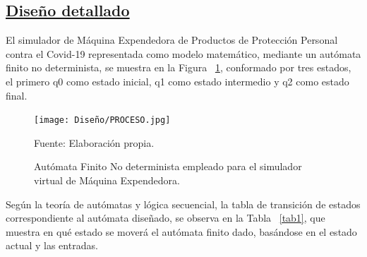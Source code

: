 \documentclass[10pt,conference]{IEEEtran}
\begin{document}
\subsection{\underline{\textbf{Diseño detallado}}}

El simulador de Máquina Expendedora de Productos de Protección Personal contra el Covid-19 representada como modelo matemático, mediante un autómata finito no determinista, se muestra en la Figura ~\ref{Tec.5}, conformado por tres estados, el primero q0 como estado inicial, q1 como estado intermedio y q2 como estado final.

    \begin{figure}[H]
    \begin{center}
    \texttt{[image: Diseño/PROCESO.jpg]}
    \centering
    \caption{\small Autómata Finito No determinista empleado para el simulador virtual de Máquina Expendedora.}
    \label{Tec.5} 
    \end{center}
    \vspace{1 mm}
    {\small Fuente: Elaboración propia.}
    \end{figure}
    
Según la teoría de autómatas y lógica secuencial, la tabla de transición de estados correspondiente al autómata diseñado, se observa en la Tabla ~\ref{tab1}, que muestra en qué estado se moverá el autómata finito dado, basándose en el estado actual y las entradas.
\end{document}

